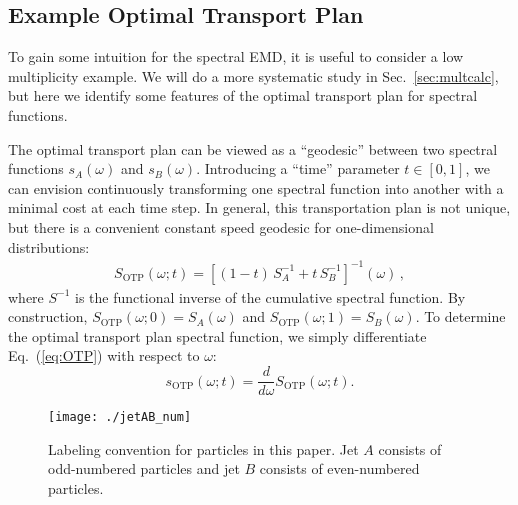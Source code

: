 \documentclass[letterpaper,11pt]{article}
\DeclareRobustCommand{\Sec}[1]{Sec.~\ref{#1}}
\DeclareRobustCommand{\Eq}[1]{Eq.~(\ref{#1})}
\begin{document}
\subsection{Example Optimal Transport Plan}
\label{sec:example_ot}

To gain some intuition for the spectral EMD, it is useful to consider a low multiplicity example.
%
We will do a more systematic study in \Sec{sec:multcalc}, but here we identify some features of the optimal transport plan for spectral functions.


The optimal transport plan can be viewed as a ``geodesic'' between two spectral functions $s_A(\omega)$ and $s_B(\omega)$.
%
Introducing a ``time'' parameter $t\in[0,1]$, we can envision continuously transforming one spectral function into another with a minimal cost at each time step.
%
In general, this transportation plan is not unique, but there is a convenient constant speed geodesic for one-dimensional distributions:
%
\begin{align}
\label{eq:OTP}
S_\text{OTP}(\omega;t) = \left[ (1-t) \, S_A^{-1}+t \, S_B^{-1} \right]^{-1}(\omega)\,,
\end{align}
%
where $S^{-1}$ is the functional inverse of the cumulative spectral function.
%
By construction, $S_\text{OTP}(\omega;0) = S_A(\omega)$ and $S_\text{OTP}(\omega;1) = S_B(\omega)$.
%
To determine the optimal transport plan spectral function, we simply differentiate \Eq{eq:OTP} with respect to $\omega$:
%
\begin{equation}
\label{eq:OTP_deriv}
s_\text{OTP}(\omega;t) = \frac{d}{d\omega}S_\text{OTP}(\omega;t).
\end{equation}


\begin{figure}[t!]
\centering
\texttt{[image: ./jetAB\_num]}
\caption{
Labeling convention for particles in this paper.
%
Jet $A$ consists of odd-numbered particles and jet $B$ consists of even-numbered particles.
}
\label{fig:jetAB}
\end{figure}
\end{document}

